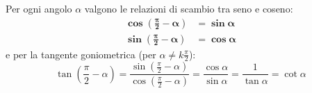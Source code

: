 \documentclass[11pt,a4paper,oneside]{report}
\begin{document}
\begin{teorema}
Per ogni angolo $\alpha$ valgono le relazioni di scambio tra seno e coseno:
\begin{align}
    \mathbf{\cos\left(\frac{\pi}{2} - \alpha\right)} &= \mathbf{\sin\alpha} \\
    \mathbf{\sin\left(\frac{\pi}{2} - \alpha\right)} &= \mathbf{\cos\alpha}
\end{align}
e per la tangente goniometrica (per $\alpha \neq k\frac{\pi}{2}$):
\begin{equation}
    \tan\left(\frac{\pi}{2} - \alpha\right) = \frac{\sin\left(\frac{\pi}{2} - \alpha\right)}{\cos\left(\frac{\pi}{2} - \alpha\right)} = \frac{\cos\alpha}{\sin\alpha} = \frac{1}{\tan\alpha} = \cot\alpha
\end{equation}
\end{teorema}
\end{document}
